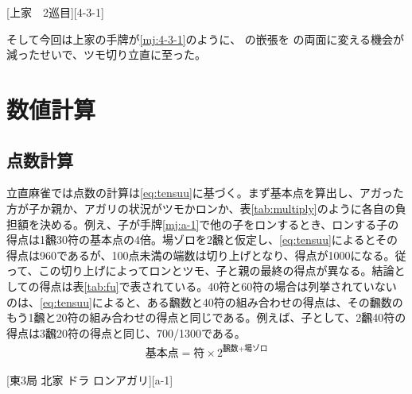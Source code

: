\documentclass[10pt, twocolumn]{article}
\begin{document}
[上家　2巡目][4-3-1]

そして今回は上家の手牌が\ref{mj:4-3-1}のように、 の嵌張を  の両面に変える機会が減ったせいで、ツモ切り立直に至った。



\clearpage
\appendix

\section{数値計算}

\subsection{点数計算} \label{sec:point}

立直麻雀では点数の計算は\eqref{eq:tensuu}に基づく。まず基本点を算出し、アガった方が子か親か、アガリの状況がツモかロンか、表\ref{tab:multiply}のように各自の負担額を決める。例え、子が手牌\ref{mj:a-1}で他の子をロンするとき、ロンする子の得点は1飜30符の基本点の4倍。場ゾロを2飜と仮定し、\eqref{eq:tensuu}によるとその得点は960であるが、100点未満の端数は切り上げとなり、得点が1000になる。従って、この切り上げによってロンとツモ、子と親の最終の得点が異なる。結論としての得点は表\ref{tab:fu}で表されている。40符と60符の場合は列挙されていないのは、\eqref{eq:tensuu}によると、ある飜数と40符の組み合わせの得点は、その飜数のもう1飜と20符の組み合わせの得点と同じである。例えば、子として、2飜40符の得点は3飜20符の得点と同じ、700/1300である。
%
\begin{align}
  \text{基本点} = \text{符} \times 2^{\text{飜数} + \text{場ゾロ}} \label{eq:tensuu}
\end{align}

[東3局 北家 ドラ  ロンアガリ][a-1]
\end{document}
